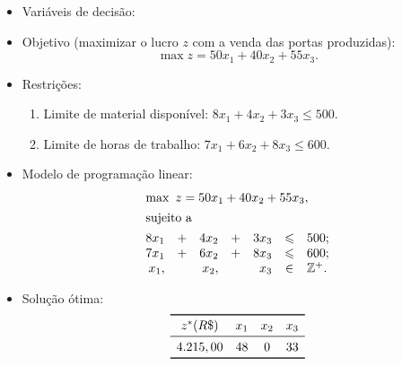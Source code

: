 \documentclass[12pt]{article}
\begin{document}
%
\begin{tcolorbox}[rounded corners, breakable,colback=yellow!5, colframe=red!40!black, title=\textbf{Modelo PL para o problema P-\myprob}]
 \begin{itemize}[topsep=0pt]
  \item Variáveis de decisão:
%
  \item Objetivo (maximizar o lucro $z$ com a venda das portas produzidas):
   $$\max z= 50x_1 + 40x_2 + 55x_3.$$
%
  \item Restrições:
   \begin{enumerate}[topsep=0pt,itemsep=0pt]
    \item Limite de material disponível: $8x_1 + 4x_2 + 3x_3 \leqslant 500$.
    \item Limite de horas de trabalho: $7x_1 + 6x_2 + 8x_3 \leqslant 600$.
   \end{enumerate}
%
    \item Modelo de programação linear:
    \small{
     $$\begin{array}{rcrcrcl}
        \multicolumn{7}{l}{\max\ z= 50x_1 + 40x_2 + 55x_3,} \\[4pt]
        \multicolumn{7}{l}{\text{sujeito a}} \\[4pt]
          8x_1 & + & 4x_2 & + & 3x_3 & \leqslant & 500;\\
          7x_1 & + & 6x_2 & + & 8x_3 & \leqslant & 600;\\
          x_1, &   & x_2, &   & x_3 & \in       & \mathbb{Z}^+.
       \end{array}$$
    }
%
    \item Solução ótima:
     $$
      \begin{array}{cccc}
      \toprule
      z^* (R\$) & x_1 & x_2 & x_3\\
      \midrule
      4.215,00  &  48 &   0 &  33\\
      \bottomrule
      \end{array}
     $$
 \end{itemize}
\end{tcolorbox}
\end{document}
